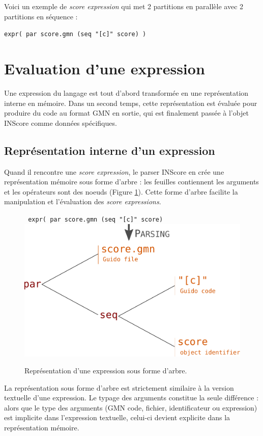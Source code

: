 \documentclass{article}
\newcommand{\OSC}[1]{\texttt{#1}}
\newcommand{\oper}[1]{\textcolor{figRed}{#1}}
\newcommand{\param}[1]{\textcolor{figOrange}{#1}}
\newcommand{\sExpr}{\emph{score expression}}
\newcommand{\sExprs}{\emph{score expressions}}
\newcommand{\sample}	[1]			{\vspace{-0.2em}\begin{center}\colorbox{mygrey}{\begin{minipage}[t]{0.97\columnwidth} {\small \texttt{#1}}\end{minipage}}\end{center}}
\begin{document}
Voici un exemple de \emph{score expression} qui met 2 partitions en parallèle avec 2 partitions en séquence :
\sample{expr( par score.gmn (seq "[c]" score) )}

\section{Evaluation d'une expression}
\label{evaluationSpec}
Une expression du langage est tout d'abord transformée en une représentation interne en mémoire. Dans un second temps, cette représentation est évaluée pour produire du code au format GMN en sortie, qui est finalement passée à l'objet INScore comme données spécifiques.

\subsection{Représentation interne d'un expression}

Quand il rencontre une  \sExpr, le parser INScore en crée une représentation mémoire sous forme d'arbre : les feuilles contiennent les arguments et les opérateurs sont des noeuds (Figure \ref{fig:parsing}). Cette forme d'arbre facilite la manipulation et l'évaluation des \sExprs.

\begin{figure}[th]
\centering
\OSC{ expr( \oper{par} \param{score.gmn}  (\oper{seq} \param{"[c]" score})}
\includegraphics[width=0.8\columnwidth]{imgs/exprParse}
\caption{Représentation d'une expression sous forme d'arbre.
\label{fig:parsing}}
\end{figure}

La représentation sous forme d'arbre est strictement similaire à la version textuelle d'une expression. Le typage des arguments constitue la seule différence : alors que le type des arguments (GMN code, fichier, identificateur ou expression) est implicite dans l'expression textuelle, celui-ci devient explicite dans la représentation mémoire. 
\end{document}
